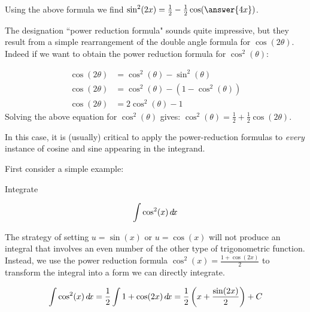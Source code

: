 \documentclass{ximera}
\begin{document}
\begin{question}
Using the above formula we find $\sin^2(2x) = \frac{1}{2}-\frac{1}{2} \cos(\answer{4x})$.
\end{question}

\begin{remark}
The designation ``power reduction formula" sounds quite impressive, but they result from a simple rearrangement of the double angle formula for $\cos(2\theta)$.  Indeed if we want to obtain the power reduction formula for $\cos^2(\theta)$:

\begin{align*}
\cos(2\theta) &= \cos^2(\theta)-\sin^2(\theta) \\
\cos(2\theta) &= \cos^2(\theta) - (1-\cos^2(\theta)) \\
\cos(2\theta) &= 2\cos^2(\theta)-1
\end{align*}
Solving the above equation for $\cos^2(\theta)$ gives: $\cos^2(\theta) = \frac{1}{2} +\frac{1}{2} \cos(2\theta)$.
\end{remark}

In this case, it is (usually) critical to apply the power-reduction
formulas to \textit{every} instance of cosine and sine appearing in
the integrand.

First consider a simple example:

\begin{example}
Integrate 

\[ 
\int \cos^{2}(x) \mathop{}\!d\! x
\]

\begin{explanation}
The strategy of setting $u=\sin(x)$ or $u=\cos(x)$ will not produce an integral that involves an even number of the other type of trigonometric function.  Instead, we use the power reduction formula $\cos^{2}(x)=\frac{1+\cos(2x)}{2}$ to transform the integral into a form we can directly integrate.

\[
\int \cos^{2} (x) \mathop{}\!d\! x= \frac{1}{2} \int 1+\cos(2x) \mathop{}\!d\! x = \frac{1}{2} \left( x+ \frac{ \sin(2x)}{2} \right) + C
\]


\end{explanation}
\end{example}
\end{document}
